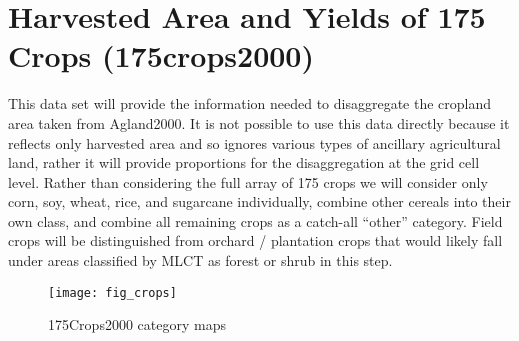 \section{Harvested Area and Yields of 175 Crops (175crops2000)}
\label{sec:175crops2000}

\citet{Monfreda2008}




This data set will provide the information needed to disaggregate the
cropland area taken from Agland2000.  It is not possible to use this
data directly because it reflects only harvested area and so ignores
various types of ancillary agricultural land, rather it will provide
proportions for the disaggregation at the grid cell level.  Rather
than considering the full array of 175 crops we will consider only
corn, soy, wheat, rice, and sugarcane individually, combine other
cereals into their own class, and combine all remaining crops as a
catch-all ``other'' category.  Field crops will be distinguished from
orchard / plantation crops that would likely fall under areas
classified by MLCT as forest or shrub in this step.


\begin{figure}[hpt] 
\begin{center} 


\texttt{[image: fig\_crops]}
\end{center} 
\caption{175Crops2000 category maps} 
\label{fig:crops} 
\end{figure} 


